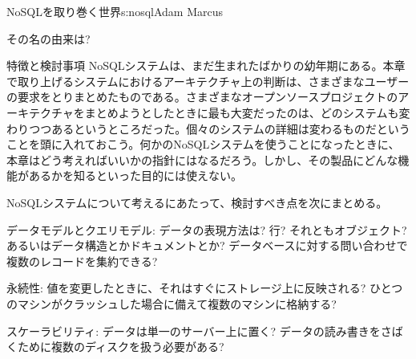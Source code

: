 \begin{aosachapter}{NoSQLを取り巻く世界}{s:nosql}{Adam Marcus}
\begin{aosasect1}{その名の由来は?}
\begin{aosasect2}{特徴と検討事項}
NoSQLシステムは、まだ生まれたばかりの幼年期にある。本章で取り上げるシステムにおけるアーキテクチャ上の判断は、さまざまなユーザーの要求をとりまとめたものである。さまざまなオープンソースプロジェクトのアーキテクチャをまとめようとしたときに最も大変だったのは、どのシステムも変わりつつあるというところだった。個々のシステムの詳細は変わるものだということを頭に入れておこう。何かのNoSQLシステムを使うことになったときに、本章はどう考えればいいかの指針にはなるだろう。しかし、その製品にどんな機能があるかを知るといった目的には使えない。


NoSQLシステムについて考えるにあたって、検討すべき点を次にまとめる。

\begin{aosadescription}

  \item{データモデルとクエリモデル}: データの表現方法は? 行? それともオブジェクト? あるいはデータ構造とかドキュメントとか? データベースに対する問い合わせで複数のレコードを集約できる?

  \item{永続性}: 値を変更したときに、それはすぐにストレージ上に反映される? ひとつのマシンがクラッシュした場合に備えて複数のマシンに格納する?

  \item{スケーラビリティ}: データは単一のサーバー上に置く? データの読み書きをさばくために複数のディスクを扱う必要がある?


\end{aosadescription}
\end{aosasect2}
\end{aosasect1}
\end{aosachapter}
